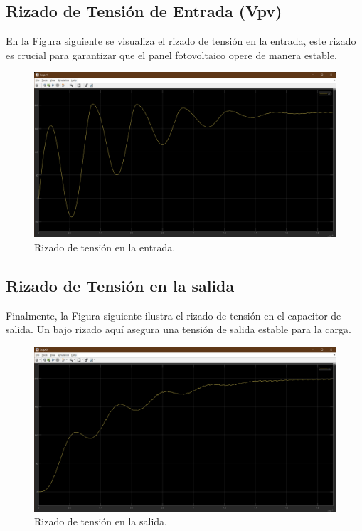 \subsection{Rizado de Tensión de Entrada (Vpv)}
En la Figura siguiente se visualiza el rizado de tensión en la entrada, este rizado es crucial para garantizar que el panel fotovoltaico opere de manera estable.


\begin{figure}[ht!]
    \centering
    \includegraphics[width=0.9\linewidth]{fot/Cin.png} 
    \caption{Rizado de tensión en la entrada.}
    \label{fig:vin}
\end{figure}


\subsection{Rizado de Tensión en la salida}
Finalmente, la Figura siguiente ilustra el rizado de tensión en el capacitor de salida. Un bajo rizado aquí asegura una tensión de salida estable para la carga.

\begin{figure}[ht!]
    \centering
    \includegraphics[width=0.9\linewidth]{fot/Cout.png} 
    \caption{Rizado de tensión en la salida.}
    \label{fig:vout}
\end{figure}

